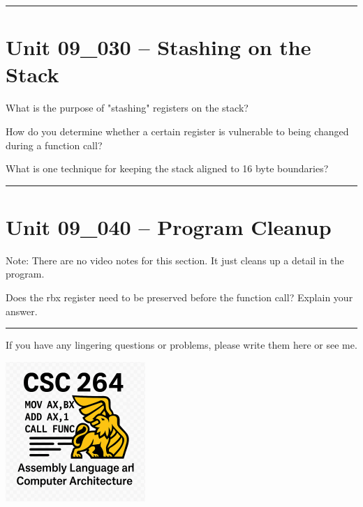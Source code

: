 \documentclass[letterpaper,12pt]{exam}
\newcommand{\unit}{Unit 09}
\begin{document}
\begin{questions}
\begin{samepage}
    \vspace{5mm}
\end{samepage}
\par
 

\rule{0.5\textwidth}{.4pt} %

\section*{\unit\_030 -- Stashing on the Stack}
\begin{samepage}
    \question What is the purpose of "stashing" registers on the stack?
    \vspace{5mm}
\end{samepage}
\par
\begin{samepage}
    \question How do you determine whether a certain register is vulnerable to being changed during a function call?
    \vspace{5mm}
\end{samepage}
\par
\begin{samepage}
    \question What is one technique for keeping the stack aligned to 16 byte boundaries?
    \vspace{5mm}
\end{samepage}
\par
  
\rule{0.5\textwidth}{.4pt} %
\section*{\unit\_040 -- Program Cleanup}
Note:  There are no video notes for this section.  It just cleans up a detail in the program.

\begin{samepage}
    \question Does the rbx register need to be preserved before the function call?  Explain your answer.
    \vspace{5mm}
\end{samepage}
\par

\end{questions} 
\begin{center}
    \rule{0.667\textwidth}{.8pt} %
\end{center}


If you have any lingering questions or problems, please write them here or see me.
\vfill
\begin{center}
\includegraphics{../csc264Logo}
\end{center}
\end{document}
